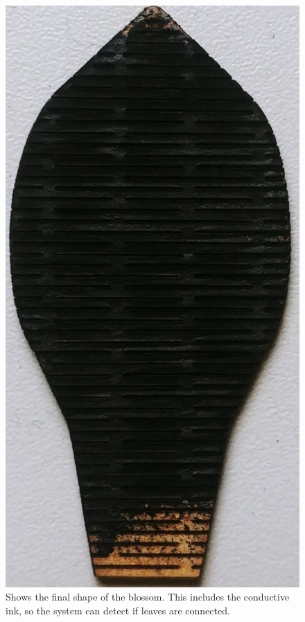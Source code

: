 \documentclass[00_doc.tex]{subfiles}
\begin{document}
    \begin{figure}[h!]
        \centering
        \includegraphics[scale=0.05]{images/process/07_LaserCut.jpg}
        \caption{Shows the final shape of the blossom. This includes the conductive ink, so the 
        system can detect if leaves are connected.}
        \label{fig:corcTest}
    \end{figure}
\end{document}
